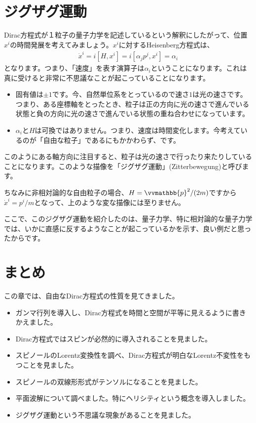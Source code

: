 \documentclass[report,paper=a4, fontsize=12pt, line_length=16cm, number_of_lines=33,dvipdfmx]{jlreq}
\numberwithin{equation}{chapter}
\newcommand{\pbb}{\vvmathbb{p}}
\begin{document}
\section{ジグザグ運動}
Dirac方程式が１粒子の量子力学を記述しているという解釈にしたがって、位置$x^{i}$の時間発展を考えてみましょう。$x^{i}$に対するHeisenberg方程式は、
\begin{align}
  \dot{x}^{i}=i[H,x^i]=i[\alpha_jp^{j}, x^{i}]=\alpha_i
\end{align}
となります。つまり、「速度」を表す演算子は$\alpha_i$ということになります。これは真に受けると非常に不思議なことが起こっていることになります。
\begin{itemize}
  \item 固有値は$\pm 1$です。今、自然単位系をとっているので速さ$1$は光の速さです。つまり、ある座標軸をとったとき、粒子は正の方向に光の速さで進んでいる状態と負の方向に光の速さで進んでいる状態の重ね合わせになっています。
  \item $\alpha_i$と$H$は可換ではありません。つまり、速度は時間変化します。今考えているのが「自由な粒子」であるにもかかわらず、です。
\end{itemize}
このようにある軸方向に注目すると、粒子は光の速さで行ったり来たりしていることになります。このような描像を「ジグザグ運動」(Zitterbewegung)と呼びます。

ちなみに非相対論的な自由粒子の場合、$H=\pbb^2/(2m)$ですから$\dot{x}^i=p^i/m$となって、上のような変な描像には至りません。

ここで、このジグザグ運動を紹介したのは、量子力学、特に相対論的な量子力学では、いかに直感に反するようなことが起こっているかを示す、良い例だと思ったからです。


\section{まとめ}
この章では、自由なDirac方程式の性質を見てきました。
\begin{itemize}
  \item ガンマ行列を導入し、Dirac方程式を時間と空間が平等に見えるように書きかえました。
  \item Dirac方程式ではスピンが必然的に導入されることを見ました。
  \item スピノールのLorentz変換性を調べ、Dirac方程式が明白なLorentz不変性をもつことを見ました。
  \item スピノールの双線形形式がテンソルになることを見ました。
  \item 平面波解について調べました。特にヘリシティという概念を導入しました。
  \item ジグザグ運動という不思議な現象があることを見ました。
\end{itemize}
\end{document}
